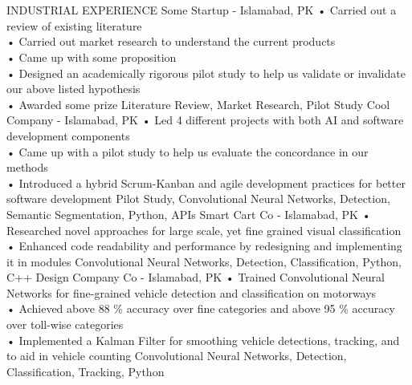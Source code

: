 \documentclass{my_cv}
\begin{document}
\section{\faBriefcase}{INDUSTRIAL EXPERIENCE}
        {Some Startup - Islamabad, PK} %
        {
            • Carried out a review of existing literature
            \\ \vspace{2pt}
            • Carried out market research to understand the current products
            \\ \vspace{2pt}
            • Came up with some proposition
            \\ \vspace{2pt}
            • Designed an academically rigorous pilot study to help us validate or invalidate our above listed hypothesis
            \\ \vspace{2pt}
            • Awarded some prize
        }  %
        {Literature Review, Market Research, Pilot Study}  %
        {Cool Company - Islamabad, PK}
        {
            • Led 4 different projects with both AI and software development components
            \\ \vspace{2pt}
            • Came up with a pilot study to help us evaluate the concordance in our methods
            \\ \vspace{2pt}
            • Introduced a hybrid Scrum-Kanban and agile development practices for better software development
        }
        {Pilot Study, Convolutional Neural Networks, Detection, Semantic Segmentation, Python, APIs}
        {Smart Cart Co - Islamabad, PK}
        {
            • Researched novel approaches for large scale, yet fine grained visual classification
            \\ \vspace{2pt}
            • Enhanced code readability and performance by redesigning and implementing it in modules}
        {Convolutional Neural Networks, Detection, Classification, Python, C++}
        {Design Company Co - Islamabad, PK}
        {
            • Trained Convolutional Neural Networks for fine-grained vehicle detection and classification on motorways
            \\ \vspace{2pt}
            • Achieved above 88 \% accuracy over fine categories and above 95 \% accuracy over toll-wise categories
            \\ \vspace{2pt}
            • Implemented a Kalman Filter for smoothing vehicle detections, tracking, and to aid in vehicle counting
        }
        {Convolutional Neural Networks, Detection, Classification, Tracking, Python}
    
\end{document}
